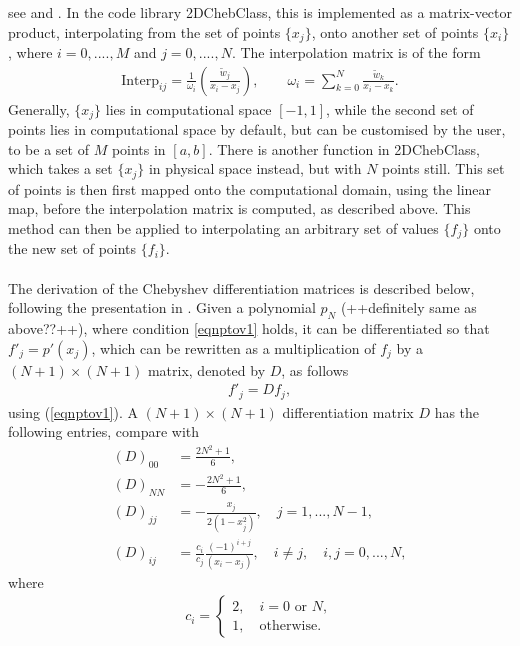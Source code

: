\documentclass[11pt, a4paper]{article}
\theoremstyle{definition}
\begin{document}
see \cite{bibTrefethenBerrut1} and \cite{GoddardPseudospectralCode1}. In the code library 2DChebClass, this is implemented as a matrix-vector product, interpolating from the set of points $\{x_j\}$, onto another set of points $\{x_i\}$, where $i = 0,...., M$ and $j = 0, ...., N$.  The interpolation matrix is of the form
\begin{align*}
	\text{Interp}_{ij} = \frac{1}{\omega_i} \left(\frac{\tilde w_j}{x_i-x_j}\right), \qquad \omega_i = \displaystyle \sum_{k=0}^N \frac{\tilde w_k}{x_i-x_k}.
\end{align*} 
Generally, $\{x_j\}$ lies in computational space $[-1,1]$, while the second set of points lies in computational space by default, but can be customised by the user, to be a set of $M$ points in $[a,b]$. There is another function in 2DChebClass, which takes a set $\{x_j\}$ in physical space instead, but with $N$ points still. This set of points is then first mapped onto the computational domain, using the linear map, before the interpolation matrix is computed, as described above. This method can then be applied to interpolating an arbitrary set of values $\{f_j\}$ onto the new set of points $\{f_i\}$. 
\\
\\
The derivation of the Chebyshev differentiation matrices is described below, following the presentation in \cite{bibTrefethen}. Given a polynomial $p_N$ (++definitely same as above??++), where condition \eqref{eqnptov1} holds, it can be differentiated so that $f'_j = p'(x_j)$, which can be rewritten as a multiplication of $f_j$ by a $(N+1) \times (N+1)$ matrix, denoted by $D$, as follows
\begin{align*}
	f'_j= D f_j,
\end{align*}
using (\ref{eqnptov1}).
A $(N+1) \times (N+1)$ differentiation matrix $D$ has the following entries, compare with \cite{bibTrefethen}
\begin{align*}
	(D)_{00}&= \frac{2N^2 +1}{6},\\
	(D)_{NN}&= -\frac{2N^2 +1}{6},\\
	(D)_{jj}&= -\frac{x_j}{2(1-x_j^2)}, \quad j=1,...,N-1,\\
	(D)_{ij}&= \frac{c_i}{c_j} \frac{(-1)^{i+j}}{(x_i-x_j)}, \quad i \neq j, \quad i,j=0,...,N,
\end{align*} 	
where 
\begin{align*}
	c_i =\left\{\begin{array}{l} 2, \quad i=0 \text{   or   }N, \\1, \quad \text{otherwise.}\end{array}\right.
\end{align*}	
\end{document}
